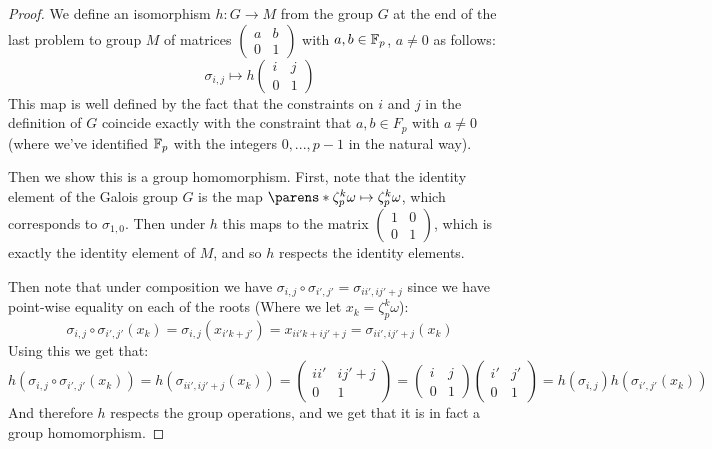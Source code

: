 \documentclass[11pt]{article}
\begin{document}
\begin{proof}
  We define an isomorphism $h: G \rightarrow M$ from the group $G$ at the end of the last problem to group $M$ of matrices $\begin{pmatrix} a & b \\ 0 & 1 \end{pmatrix}$ with $a,b \in \mathbb{F}_p$, $a \ne 0$ as follows:
  \begin{equation*}
    \sigma_{i,j}
    \mapsto{h}
    \begin{pmatrix} i & j \\ 0 & 1 \end{pmatrix}
  \end{equation*}
  This map is well defined by the fact that the constraints on $i$ and $j$ in the definition of $G$ coincide exactly with the constraint that $a,b \in F_p$ with $a \ne 0$ (where we've identified $\mathbb{F}_p$ with the integers $0,...,p-1$ in the natural way).

  Then we show this is a group homomorphism.
  First, note that the identity element of the Galois group $G$ is the map $\parens*{\zeta_p^k\omega \mapsto \zeta_p^k\omega}$, which corresponds to $\sigma_{1,0}$.
  Then under $h$ this maps to the matrix $\begin{pmatrix} 1 & 0 \\ 0 & 1 \end{pmatrix}$, which is exactly the identity element of $M$, and so $h$ respects the identity elements.

  Then note that under composition we have $\sigma_{i,j} \circ \sigma_{i',j'} = \sigma_{ii', ij' + j}$ since we have point-wise equality on each of the roots (Where we let $x_k = \zeta_p^k\omega$):
  \begin{equation*}
    \sigma_{i,j} \circ \sigma_{i',j'} (x_k)
    = \sigma_{i,j}(x_{i'k + j'})
    = x_{ii'k + ij' + j}
    = \sigma_{ii', ij' + j}(x_k)
  \end{equation*}
  Using this we get that:
  \begin{equation*}
    h(\sigma_{i,j} \circ \sigma_{i',j'} (x_k))
    = h(\sigma_{ii', ij' + j}(x_k))
    = \begin{pmatrix} ii' & ij' + j \\ 0 & 1 \end{pmatrix}
    = \begin{pmatrix} i & j \\ 0 & 1 \end{pmatrix}\begin{pmatrix} i' & j' \\ 0 & 1 \end{pmatrix}
    = h(\sigma_{i,j}) h( \sigma_{i',j'} (x_k))
  \end{equation*}
  And therefore $h$ respects the group operations, and we get that it
  is in fact a group homomorphism.


\end{proof}
\end{document}
